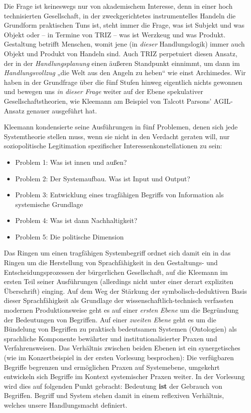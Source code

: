 \documentclass[11pt,a4paper]{article}
\begin{document}
Die Frage ist keineswegs nur von akademischem Interesse, denn in einer hoch
technisierten Gesellschaft, in der zweckgerichtetes instrumentelles Handeln
die Grundform praktischen Tuns ist, steht immer die Frage, was ist Subjekt und
was Objekt oder -- in Termine von TRIZ -- was ist Werzkeug und was
Produkt. Gestaltung betrifft Menschen, womit jene (in \emph{dieser}
Handlungslogik) immer auch Objekt und Produkt von Handeln sind. Auch TRIZ
perpetuiert diesen Ansatz, der in der \emph{Handlungsplanung} einen äußeren
Standpunkt einnimmt, um dann im \emph{Handlungsvollzug} „die Welt aus den
Angeln zu heben“ wie einst Archimedes. Wir haben in der Grundfrage über die
fünf Stufen hinweg eigentlich nichts gewonnen und bewegen uns \emph{in dieser
  Frage} weiter auf der Ebene spekulativer Gesellschaftstheorien, wie Kleemann
am Beispiel von Talcott Parsons' AGIL-Ansatz genauer ausgeführt hat.

Kleemann kondensierte seine Ausführungen in fünf Problemen, denen sich jede
Systemtheorie stellen muss, wenn sie nicht in den Verdacht geraten will, nur
soziopolitische Legitimation spezifischer Interessenkonstellationen zu sein:

\begin{itemize}[noitemsep]
\item Problem 1: Was ist innen und außen?
\item Problem 2: Der Systemaufbau. Was ist Input und Output?
\item Problem 3: Entwicklung eines tragfähigen Begriffs von Information als
  systemische Grundlage
\item Problem 4: Was ist dann Nachhaltigkeit?
\item Problem 5: Die politische Dimension
\end{itemize}

Das Ringen um einen tragfähigen Systembegriff ordnet sich damit ein in das
Ringen um die Herstellung von Sprachfähigkeit in den Gestaltungs- und
Entscheidungsprozessen der bürgerlichen Gesellschaft, auf die Kleemann im
ersten Teil seiner Ausführungen (allerdings nicht unter einer derart
expliziten Überschrift) einging. Auf dem Weg der Stärkung der
symbolisch-deduktiven Basis dieser Sprachfähigkeit als Grundlage der
wissenschaftlich-tech\-nisch verfassten modernen Produktionsweise geht es auf
einer \emph{ersten Ebene} um die Begründung der Bedeutungen von Begriffen. Auf
einer \emph{zweiten Ebene} geht es um die Bündelung von Begriffen zu praktisch
bedeutsamen Systemen (Ontologien) als sprachliche Komponente bewährter und
institutionalisierter Praxen und Verfahrensweisen. Das Verhältnis zwischen
beiden Ebenen ist ein synergetisches (wie im Konzertbeispiel in der ersten
Vorlesung besprochen): Die verfügbaren Begriffe begrenzen und ermöglichen
Praxen auf Systemebene, umgekehrt entwickeln sich Begriffe im Kontext
systemischer Praxen weiter. In der Vorlesung wird dies auf folgenden Punkt
gebracht: Bedeutung \textbf{ist} der Gebrauch von Begriffen.  Begriff und
System stehen damit in einem reflexiven Verhältnis, welches unsere
Handlungsmacht definiert.
\end{document}
